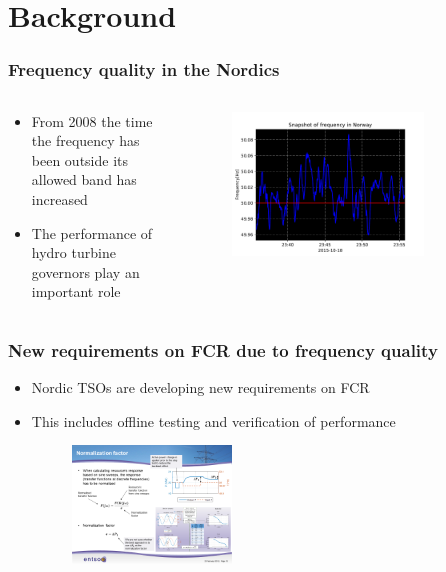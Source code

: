 \section{Background}
\begin{frame}
	\frametitle{Frequency quality in the Nordics}
	\begin{columns}
		\begin{column}{0.5\textwidth}
			\begin{itemize}
				\item From 2008 the time the frequency has been outside its allowed band has increased
				\item The performance of hydro turbine governors play an important role
			\end{itemize}
		\end{column}
		\begin{column}{0.5\textwidth}
			\begin{figure}
				\includegraphics[width=0.8\textwidth]{./pictures/frequency.pdf}
			\end{figure}
		\end{column}
	\end{columns}
\end{frame}
\begin{frame}
	\frametitle{New requirements on FCR due to frequency quality}
	\begin{itemize}
		\item Nordic TSOs are developing new requirements on FCR
		\item This includes offline testing and verification of performance
		\begin{figure}
				\includegraphics[width=0.4\textwidth]{./pictures/fcr}
		\end{figure}
	\end{itemize}
\end{frame}
